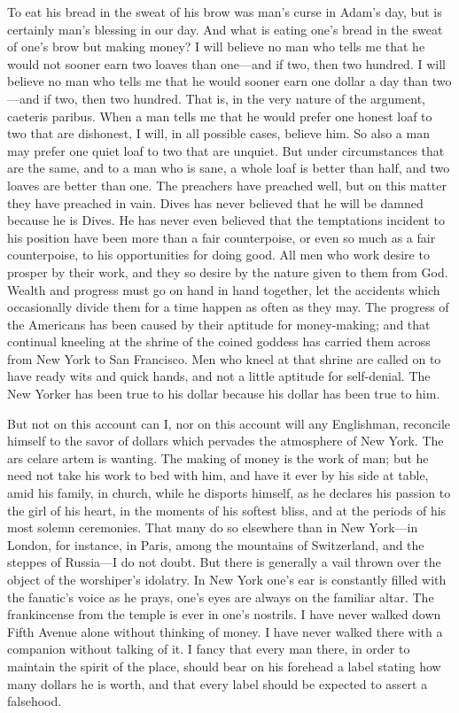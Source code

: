 To eat his bread in the sweat of his brow was man's curse in Adam's
day, but is certainly man's blessing in our day.  And what is
eating one's bread in the sweat of one's brow but making money?  I
will believe no man who tells me that he would not sooner earn two
loaves than one---and if two, then two hundred.  I will believe no
man who tells me that he would sooner earn one dollar a day than
two---and if two, then two hundred.  That is, in the very nature of
the argument, caeteris paribus.  When a man tells me that he would
prefer one honest loaf to two that are dishonest, I will, in all
possible cases, believe him.  So also a man may prefer one quiet
loaf to two that are unquiet.  But under circumstances that are the
same, and to a man who is sane, a whole loaf is better than half,
and two loaves are better than one.  The preachers have preached
well, but on this matter they have preached in vain.  Dives has
never believed that he will be damned because he is Dives.  He has
never even believed that the temptations incident to his position
have been more than a fair counterpoise, or even so much as a fair
counterpoise, to his opportunities for doing good.  All men who
work desire to prosper by their work, and they so desire by the
nature given to them from God.  Wealth and progress must go on hand
in hand together, let the accidents which occasionally divide them
for a time happen as often as they may.  The progress of the
Americans has been caused by their aptitude for money-making; and
that continual kneeling at the shrine of the coined goddess has
carried them across from New York to San Francisco.  Men who kneel
at that shrine are called on to have ready wits and quick hands,
and not a little aptitude for self-denial.  The New Yorker has been
true to his dollar because his dollar has been true to him.

But not on this account can I, nor on this account will any
Englishman, reconcile himself to the savor of dollars which
pervades the atmosphere of New York.  The ars celare artem is
wanting.  The making of money is the work of man; but he need not
take his work to bed with him, and have it ever by his side at
table, amid his family, in church, while he disports himself, as he
declares his passion to the girl of his heart, in the moments of
his softest bliss, and at the periods of his most solemn
ceremonies.  That many do so elsewhere than in New York---in London,
for instance, in Paris, among the mountains of Switzerland, and the
steppes of Russia---I do not doubt.  But there is generally a vail
thrown over the object of the worshiper's idolatry.  In New York
one's ear is constantly filled with the fanatic's voice as he
prays, one's eyes are always on the familiar altar.  The
frankincense from the temple is ever in one's nostrils.  I have
never walked down Fifth Avenue alone without thinking of money.  I
have never walked there with a companion without talking of it.  I
fancy that every man there, in order to maintain the spirit of the
place, should bear on his forehead a label stating how many dollars
he is worth, and that every label should be expected to assert a
falsehood.

